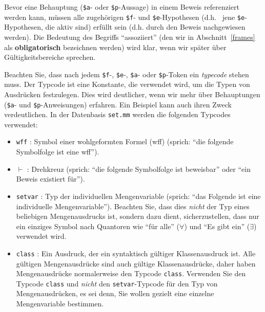Bevor eine Behauptung (\texttt{\$a}- oder \texttt{\$p}-Aussage) in einem Beweis referenziert werden kann, müssen alle zugehörigen \texttt{\$f}- und \texttt{\$e}-Hypothesen (d.h. \ jene \texttt{\$e}-Hypothesen, die aktiv sind) erfüllt sein (d.h. durch den Beweis nachgewiesen werden).  Die Bedeutung des Begriffs "`assoziiert"' (den wir in Abschnitt~\ref{frames} als {\bf obligatorisch} bezeichnen werden) wird klar, wenn wir später über Gültigkeitsbereiche sprechen.

Beachten Sie, dass nach jedem \texttt{\$f}-, \texttt{\$e}-, \texttt{\$a}- oder \texttt{\$p}-Token ein \textit{typecode} stehen muss. Der Typcode ist eine Konstante, die verwendet wird, um die Typen von Ausdrücken festzulegen. Dies wird deutlicher, wenn wir mehr über Behauptungen (\texttt{\$a}- und \texttt{\$p}-Anweisungen) erfahren. Ein Beispiel kann auch ihren Zweck verdeutlichen. In der Datenbasis \texttt{set.mm}%
 werden die folgenden Typcodes verwendet:

\begin{itemize}
\item \texttt{wff} :
  Symbol einer wohlgeformten Formel (wff)
  (sprich: "`die folgende Symbolfolge ist eine wff"').
\item \texttt{$\vdash$} :
  Drehkreuz (sprich: "`die folgende Symbolfolge ist beweisbar"' oder "`ein Beweis existiert für"').
\item \texttt{setvar} :
  Typ der individuellen Mengenvariable (sprich: "`das Folgende ist eine individuelle Mengenvariable"').   Beachten Sie, dass dies \textit{nicht} der Typ eines beliebigen Mengenausdrucks ist, sondern dazu dient, sicherzustellen, dass nur ein einziges Symbol nach Quantoren wie "`für alle"' ($\forall$) und "`Es gibt ein"' ($\exists$) verwendet wird.
\item \texttt{class} :
  Ein Ausdruck, der ein syntaktisch gültiger Klassenausdruck ist.   Alle gültigen Mengenausdrücke sind auch gültige Klassenausdrücke, daher haben Mengenausdrücke normalerweise den Typcode \texttt{class}.   Verwenden Sie den Typcode \texttt{class} und \textit{nicht} den \texttt{setvar}-Typcode für den Typ von Mengenausdrücken, es sei denn, Sie wollen gezielt eine einzelne Mengenvariable bestimmen.
\end{itemize}

